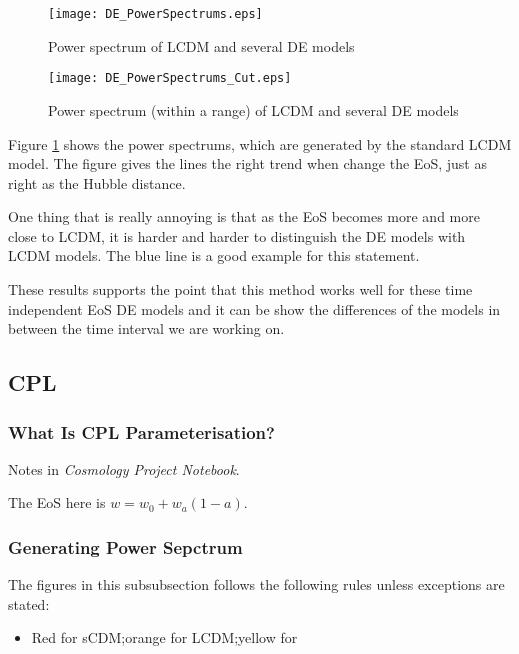 \begin{figure}[!htbp]
\centering
\texttt{[image: DE\_PowerSpectrums.eps]}
\caption{Power spectrum of LCDM and several DE models}\label{fig:DE_PowerSpectrums}
\end{figure}

\begin{figure}[!htbp]
\centering
\texttt{[image: DE\_PowerSpectrums\_Cut.eps]}
\caption{Power spectrum (within a range) of LCDM and several DE models}\label{fig:DE_PowerSpectrums_Cut}
\end{figure}



Figure \ref{fig:DE_PowerSpectrums} shows the power spectrums, which are generated by the standard LCDM model. The figure gives the lines the right trend when change the EoS, just as right as the Hubble distance.

One thing that is really annoying is that as the EoS becomes more and more close to LCDM, it is harder and harder to distinguish the DE models with LCDM models. The blue line is a good example for this statement.



These results supports the point that this method works well for these time independent EoS DE models and it can be show the differences of the models in between the time interval we are working on.











\subsection{CPL}


\subsubsection{What Is CPL Parameterisation?}

Notes in {\it Cosmology Project Notebook}.

The EoS here is $w=w_0+w_a(1-a)$.

\subsubsection{Generating Power Sepctrum}

The figures in this subsubsection follows the following rules unless exceptions are stated:
\begin{itemize}
\item
Red for sCDM;orange for LCDM;yellow for 

\end{itemize}

